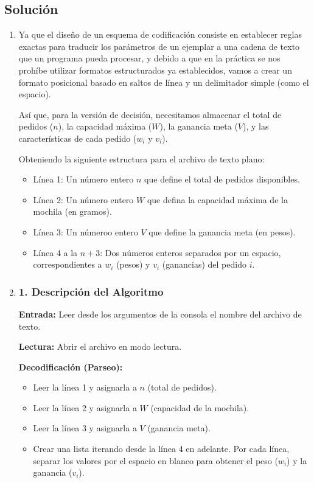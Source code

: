 \subsection{Solución}
\begin{enumerate}[label=(\alph*), leftmargin=*]
    \item Ya que el diseño de un esquema de codificación consiste en establecer reglas exactas para traducir los parámetros de un ejemplar a una cadena de texto que un programa pueda procesar, y debido a que en la práctica se nos prohíbe utilizar formatos estructurados ya establecidos, vamos a crear un formato posicional basado en saltos de línea y un delimitador simple (como el espacio).
    
    Así que, para la versión de decisión, necesitamos almacenar el total de pedidos ($n$), la capacidad máxima ($W$), la ganancia meta ($V$), y las características de cada pedido ($w_i \text{ y } v_i$).

    Obteniendo la siguiente estructura para el archivo de texto plano:

    \begin{itemize}[leftmargin=*]
        \item Línea 1: Un número entero $n$ que define el total de pedidos disponibles.
        \item Línea 2: Un número entero $W$ que defina la capacidad máxima de la mochila (en gramos).
        \item Línea 3: Un númeroo entero $V$ que define la ganancia meta (en pesos).
        \item Línea 4 a la $n + 3$: Dos números enteros separados por un espacio, correspondientes a $w_i$ (pesos) y $v_i$ (ganancias) del pedido $i$.
    \end{itemize}

    \item \subsubsection*{1. Descripción del Algoritmo}

    \textbf{Entrada:} Leer desde los argumentos de la consola el nombre del archivo de texto.
    
    \textbf{Lectura:} Abrir el archivo en modo lectura.
    
    \textbf{Decodificación (Parseo):}
    
    \begin{itemize}[leftmargin=*]
        \item Leer la línea 1 y asignarla a $n$ (total de pedidos).
        \item Leer la línea 2 y asignarla a $W$ (capacidad de la mochila).
        \item Leer la línea 3 y asignarla a $V$ (ganancia meta).
        \item Crear una lista iterando desde la línea 4 en adelante. Por cada línea, separar los valores por el espacio en blanco para obtener el peso ($w_i$) y la ganancia ($v_i$).
    \end{itemize}
    

\end{enumerate}
